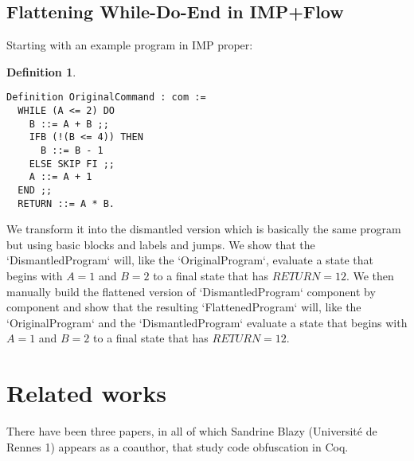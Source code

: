 \documentclass[compsoc,conference,a4paper,10pt,times]{IEEEtran}
\newtheorem{defin}[theorem]{Definition}
\begin{document}
\subsection{Flattening While-Do-End in IMP+Flow}

Starting with an example program in IMP proper:

\begin{defin}
    
    \begin{verbatim}
Definition OriginalCommand : com :=
  WHILE (A <= 2) DO
    B ::= A + B ;;
    IFB (!(B <= 4)) THEN
      B ::= B - 1
    ELSE SKIP FI ;;
    A ::= A + 1
  END ;;
  RETURN ::= A * B.
  \end{verbatim}
  \end{defin}

We transform it into the dismantled version which is basically the same program but using basic blocks and labels and jumps. We show that the `DismantledProgram` will, like the `OriginalProgram`, evaluate a state that begins with $A = 1$ and $B = 2$ to a final state that has $RETURN = 12$. We then manually build the flattened version of `DismantledProgram` component by component and show that the resulting `FlattenedProgram` will, like the `OriginalProgram` and the `DismantledProgram` evaluate a state that begins with $A = 1$ and $B = 2$ to a final state that has $RETURN = 12$.






















\section{Related works}
There have been three papers, in all of which Sandrine Blazy (Universit\'{e} de Rennes 1) appears as a coauthor, that study code obfuscation in Coq.
\end{document}

